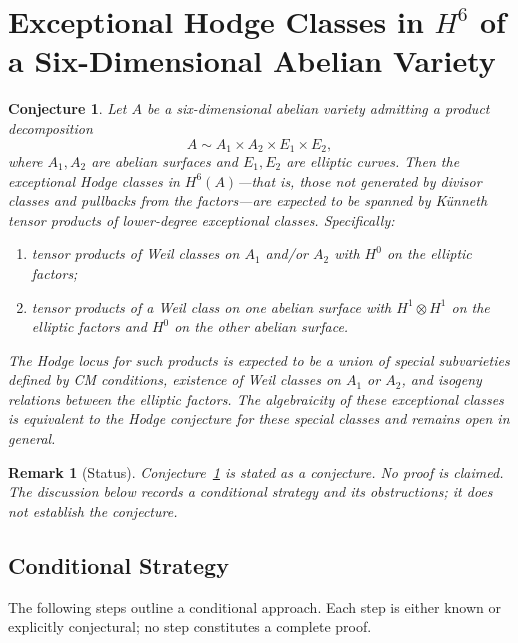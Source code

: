 \documentclass{article}
\newtheorem{conjecture}{Conjecture}
\newtheorem{remark}{Remark}
\begin{document}
\section{Exceptional Hodge Classes in $H^6$ of a Six-Dimensional Abelian Variety}
\label{sec:exceptional-hodge-h6}

\begin{conjecture}
\label{conj:exceptional-h6}
Let $A$ be a six-dimensional abelian variety admitting a product decomposition
\[
A \sim A_1 \times A_2 \times E_1 \times E_2,
\]
where $A_1, A_2$ are abelian surfaces and $E_1, E_2$ are elliptic curves. Then the exceptional Hodge classes in $H^6(A)$---that is, those not generated by divisor classes and pullbacks from the factors---are expected to be spanned by K\"unneth tensor products of lower-degree exceptional classes. Specifically:
\begin{enumerate}
  \item tensor products of Weil classes on $A_1$ and/or $A_2$ with $H^0$ on the elliptic factors;
  \item tensor products of a Weil class on one abelian surface with $H^1 \otimes H^1$ on the elliptic factors and $H^0$ on the other abelian surface.
\end{enumerate}
The Hodge locus for such products is expected to be a union of special subvarieties defined by CM conditions, existence of Weil classes on $A_1$ or $A_2$, and isogeny relations between the elliptic factors. The algebraicity of these exceptional classes is equivalent to the Hodge conjecture for these special classes and remains open in general.
\end{conjecture}

\begin{remark}[Status]
\label{rem:status}
Conjecture~\ref{conj:exceptional-h6} is stated as a conjecture. No proof is claimed. The discussion below records a conditional strategy and its obstructions; it does not establish the conjecture.
\end{remark}

\subsection{Conditional Strategy}
\label{subsec:conditional-strategy}

The following steps outline a conditional approach. Each step is either known or explicitly conjectural; no step constitutes a complete proof.
\end{document}
